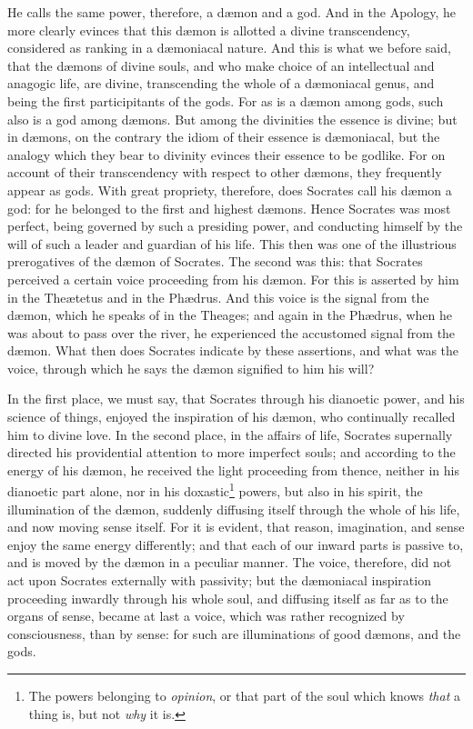 \documentclass[12pt]{article}
\begin{document}
He calls the same power, therefore, a d{\ae}mon and a god. And in the Apology,
he more clearly evinces that this d{\ae}mon is allotted a divine transcendency,
considered as ranking in a d{\ae}moniacal nature. And this is what we before
said, that the d{\ae}mons of divine souls, and who make choice of an
intellectual and anagogic life, are divine, transcending the whole of a
d{\ae}moniacal genus, and being the first participitants of the gods. For as is
a d{\ae}mon among gods, such also is a god among d{\ae}mons. But among the
divinities the essence is divine; but in d{\ae}mons, on the contrary the idiom
of their essence is d{\ae}moniacal, but the analogy which they bear to divinity
evinces their essence to be godlike. For on account of their transcendency with
respect to other d{\ae}mons, they frequently appear as gods. With great
propriety, therefore, does Socrates call his d{\ae}mon a god: for he belonged
to the first and highest d{\ae}mons. Hence Socrates was most perfect, being
governed by such a presiding power, and conducting himself by the will of such
a leader and guardian of his life. This then was one of the illustrious
prerogatives of the d{\ae}mon of Socrates. The second was this: that Socrates
perceived a certain voice proceeding from his d{\ae}mon. For this is asserted
by him in the The{\ae}tetus and in the Ph{\ae}drus. And this voice is the
signal from the d{\ae}mon, which he speaks of in the Theages; and again in the
Ph{\ae}drus, when he was about to pass over the river, he experienced the
accustomed signal from the d{\ae}mon. What then does Socrates indicate by these
assertions, and what was the voice, through which he says the d{\ae}mon
signified to him his will?

In the first place, we must say, that Socrates through his dianoetic power, and
his science of things, enjoyed the inspiration of his d{\ae}mon, who
continually recalled him to divine love. In the second place, in the affairs of
life, Socrates supernally directed his providential attention to more imperfect
souls; and according to the energy of his d{\ae}mon, he received the light
proceeding from thence, neither in his dianoetic part alone, nor in his
doxastic\footnote{The powers belonging to \textit{opinion}, or that part of the
soul which knows \textit{that} a thing is, but not \textit{why} it is.} powers,
but also in his spirit, the illumination of the d{\ae}mon, suddenly diffusing
itself through the whole of his life, and now moving sense itself. For it is
evident, that reason, imagination, and sense enjoy the same energy differently;
and that each of our inward parts is passive to, and is moved by the d{\ae}mon
in a peculiar manner. The voice, therefore, did not act upon Socrates
externally with passivity; but the d{\ae}moniacal inspiration proceeding
inwardly through his whole soul, and diffusing itself as far as to the organs
of sense, became at last a voice, which was rather recognized by consciousness,
than by sense: for such are illuminations of good d{\ae}mons, and the gods.
\end{document}
